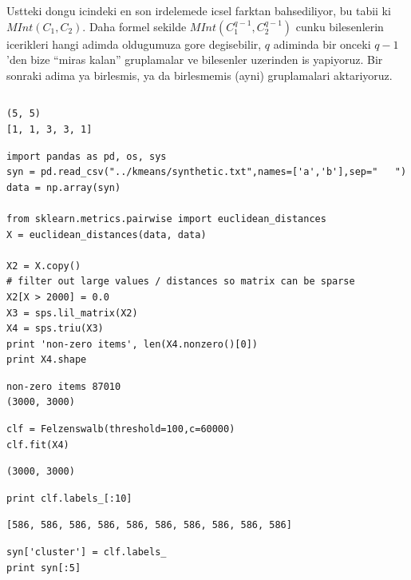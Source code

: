 \documentclass[12pt,fleqn]{article}\usepackage{../common}
\begin{document}
Ustteki dongu icindeki en son irdelemede icsel farktan bahsediliyor, bu
tabii ki $MInt(C_1,C_2)$. Daha formel sekilde $MInt(C_1^{q-1},C_2^{q-1})$
cunku bilesenlerin icerikleri hangi adimda oldugumuza gore degisebilir, $q$
adiminda bir onceki $q-1$'den bize ``miras kalan'' gruplamalar ve
bilesenler uzerinden is yapiyoruz. Bir sonraki adima ya birlesmis, ya da
birlesmemis (ayni) gruplamalari aktariyoruz. 

\inputminted[fontsize=\footnotesize]{python}{felz.py}

\begin{verbatim}
(5, 5)
[1, 1, 3, 3, 1]
\end{verbatim}

\begin{verbatim}
import pandas as pd, os, sys
syn = pd.read_csv("../kmeans/synthetic.txt",names=['a','b'],sep="   ")
data = np.array(syn)

from sklearn.metrics.pairwise import euclidean_distances
X = euclidean_distances(data, data)

X2 = X.copy()
# filter out large values / distances so matrix can be sparse
X2[X > 2000] = 0.0
X3 = sps.lil_matrix(X2)
X4 = sps.triu(X3)
print 'non-zero items', len(X4.nonzero()[0])
print X4.shape
\end{verbatim}

\begin{verbatim}
non-zero items 87010
(3000, 3000)
\end{verbatim}

\begin{verbatim}
clf = Felzenswalb(threshold=100,c=60000)
clf.fit(X4)
\end{verbatim}

\begin{verbatim}
(3000, 3000)
\end{verbatim}

\begin{verbatim}
print clf.labels_[:10]
\end{verbatim}

\begin{verbatim}
[586, 586, 586, 586, 586, 586, 586, 586, 586, 586]
\end{verbatim}

\begin{verbatim}
syn['cluster'] = clf.labels_
print syn[:5]
\end{verbatim}
\end{document}
